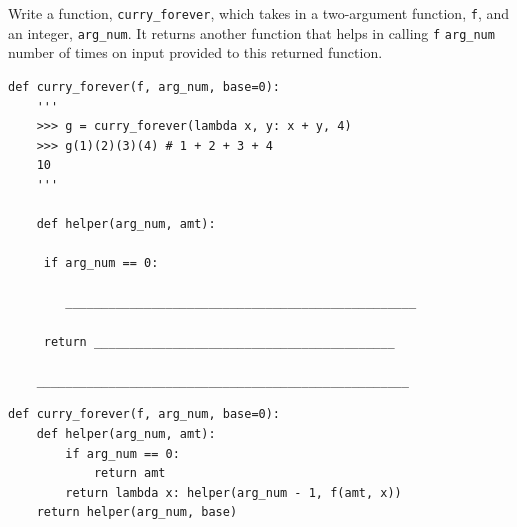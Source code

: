 \begin{blocksection}
\question Write a function, \texttt{curry\_forever}, which takes in a two-argument function, \texttt{f}, and an integer, \texttt{arg\_num}. It returns another function that helps in calling \texttt{f} \texttt{arg\_num} number of times on input provided to this returned function.

\begin{lstlisting}
def curry_forever(f, arg_num, base=0):
    '''
    >>> g = curry_forever(lambda x, y: x + y, 4)
    >>> g(1)(2)(3)(4) # 1 + 2 + 3 + 4
    10 
    '''

    def helper(arg_num, amt):
    
   	 if arg_num == 0:
   	 
   	    _________________________________________________
   	    
   	 return __________________________________________
   	 
    ____________________________________________________

\end{lstlisting}

\begin{solution}
\begin{lstlisting}
def curry_forever(f, arg_num, base=0):
    def helper(arg_num, amt):
   	    if arg_num == 0:
   		    return amt
   	    return lambda x: helper(arg_num - 1, f(amt, x))
    return helper(arg_num, base)

\end{lstlisting}
\end{solution}
\end{blocksection}